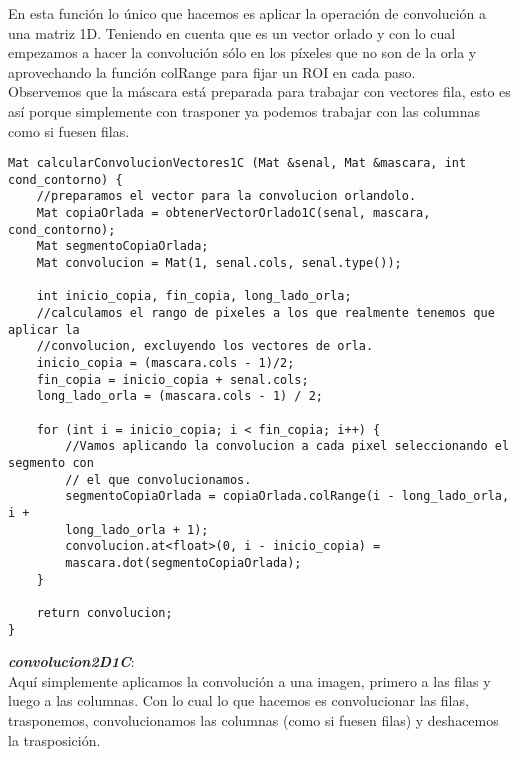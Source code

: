 \documentclass[10pt,a4paper]{article}
\begin{document}
En esta función lo único que hacemos es aplicar la operación de convolución a una matriz 1D. Teniendo en cuenta que es un vector orlado y con lo cual empezamos a hacer la convolución sólo en los píxeles que no son de la orla y aprovechando la función colRange para fijar un ROI en cada paso.\\

Observemos que la máscara está preparada para trabajar con vectores fila, esto es así porque simplemente con trasponer ya podemos trabajar con las columnas como si fuesen filas.\\

\begin{lstlisting}
Mat calcularConvolucionVectores1C (Mat &senal, Mat &mascara, int cond_contorno) {
	//preparamos el vector para la convolucion orlandolo.
	Mat copiaOrlada = obtenerVectorOrlado1C(senal, mascara, cond_contorno);
	Mat segmentoCopiaOrlada;
	Mat convolucion = Mat(1, senal.cols, senal.type());

	int inicio_copia, fin_copia, long_lado_orla;
	//calculamos el rango de pixeles a los que realmente tenemos que aplicar la 
	//convolucion, excluyendo los vectores de orla.
	inicio_copia = (mascara.cols - 1)/2;
	fin_copia = inicio_copia + senal.cols;
	long_lado_orla = (mascara.cols - 1) / 2;

	for (int i = inicio_copia; i < fin_copia; i++) {
		//Vamos aplicando la convolucion a cada pixel seleccionando el segmento con
		// el que convolucionamos.
		segmentoCopiaOrlada = copiaOrlada.colRange(i - long_lado_orla, i +
		long_lado_orla + 1);
		convolucion.at<float>(0, i - inicio_copia) = 
		mascara.dot(segmentoCopiaOrlada);
	}

	return convolucion;
}
\end{lstlisting}

\textbf{\textit{convolucion2D1C}}:\\

Aquí simplemente aplicamos la convolución a una imagen, primero a las filas y luego a las columnas. Con lo cual lo que hacemos es convolucionar las filas, trasponemos, convolucionamos las columnas (como si fuesen filas) y deshacemos la trasposición.\\
\end{document}
